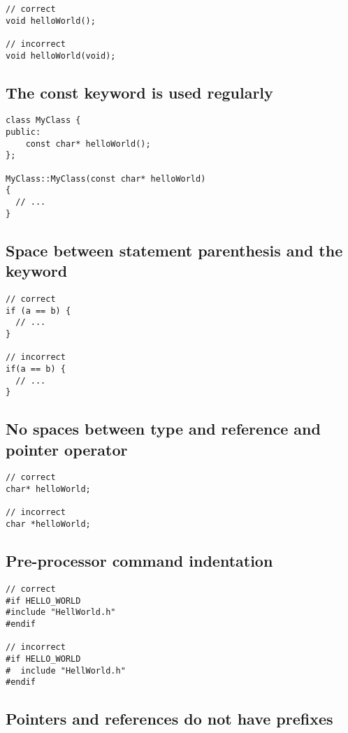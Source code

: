 \begin{verbatim}
// correct
void helloWorld();

// incorrect
void helloWorld(void);
\end{verbatim}

\subsection{The const keyword is used regularly}

\begin{verbatim}
class MyClass {
public:
    const char* helloWorld();
};

MyClass::MyClass(const char* helloWorld)
{
  // ...
}
\end{verbatim}

\subsection{Space between statement parenthesis and the keyword}

\begin{verbatim}
// correct
if (a == b) {
  // ...
}

// incorrect
if(a == b) {
  // ...
}
\end{verbatim}

\subsection{No spaces between type and reference and pointer operator}

\begin{verbatim}
// correct
char* helloWorld;

// incorrect
char *helloWorld;
\end{verbatim}

\subsection{Pre-processor command indentation}

\begin{verbatim}
// correct
#if HELLO_WORLD
#include "HellWorld.h"
#endif

// incorrect
#if HELLO_WORLD
#  include "HellWorld.h"
#endif
\end{verbatim}

\subsection{Pointers and references do not have prefixes}

